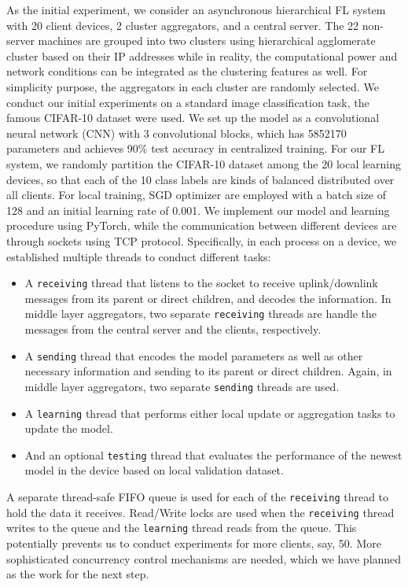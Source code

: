 \documentclass[10pt,twocolumn,letterpaper]{article}
\theoremstyle{definition}
\begin{document}
As the initial experiment, we consider an asynchronous hierarchical FL system with 20 client devices, 2 cluster aggregators, and a central server. The 22 non-server machines are grouped into two clusters using hierarchical agglomerate cluster based on their IP addresses while in reality, the computational power and network conditions can be integrated as the clustering features as well. For simplicity purpose, the aggregators in each cluster are randomly selected. We conduct our initial experiments on a standard image classification task, the famous CIFAR-10 dataset were used. We set up the model as a convolutional neural network (CNN) with 3 convolutional blocks, which has 5852170 parameters and achieves 90\% test accuracy in centralized training. For our FL system, we randomly partition the CIFAR-10 dataset among the 20 local learning devices, so that each of the 10 class labels are kinds of balanced distributed over all clients. For local training, SGD optimizer are employed with a batch size of 128 and an initial learning rate of 0.001. We implement our model and learning procedure using PyTorch, while the communication between different devices are through sockets using TCP protocol. Specifically, in each process on a device, we established multiple threads to conduct different tasks: 
\begin{itemize}
    \item A \texttt{receiving} thread that listens to the socket to receive uplink/downlink messages from its parent or direct children, and decodes the information. In middle layer aggregators, two separate \texttt{receiving} threads are handle the messages from the central server and the clients, respectively.
    \item A \texttt{sending} thread that encodes the model parameters as well as other necessary information and sending to its parent or direct children. Again, in middle layer aggregators, two separate \texttt{sending} threads are used.
    \item A \texttt{learning} thread that performs either local update or aggregation tasks to update the model. 
    \item And an optional \texttt{testing} thread that evaluates the performance of the newest model in the device based on local validation dataset. 
\end{itemize}

A separate thread-safe FIFO queue is used for each of the \texttt{receiving} thread to hold the data it receives. Read/Write locks are used when the \texttt{receiving} thread writes to the queue and the \texttt{learning} thread reads from the queue. This potentially prevents us to conduct experiments for more clients, say, 50. More sophisticated concurrency control mechanisms are needed, which we have planned as the work for the next step. 
\end{document}
